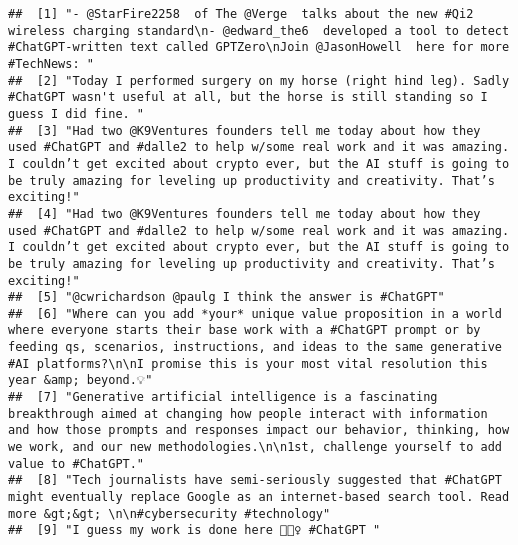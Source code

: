 \documentclass[
]{article}
\begin{document}
\begin{verbatim}
##  [1] "- @StarFire2258  of The @Verge  talks about the new #Qi2 wireless charging standard\n- @edward_the6  developed a tool to detect #ChatGPT-written text called GPTZero\nJoin @JasonHowell  here for more #TechNews: "                                                                                            
##  [2] "Today I performed surgery on my horse (right hind leg). Sadly #ChatGPT wasn't useful at all, but the horse is still standing so I guess I did fine. "                                                                                                                                                          
##  [3] "Had two @K9Ventures founders tell me today about how they used #ChatGPT and #dalle2 to help w/some real work and it was amazing. I couldn’t get excited about crypto ever, but the AI stuff is going to be truly amazing for leveling up productivity and creativity. That’s exciting!"                        
##  [4] "Had two @K9Ventures founders tell me today about how they used #ChatGPT and #dalle2 to help w/some real work and it was amazing. I couldn’t get excited about crypto ever, but the AI stuff is going to be truly amazing for leveling up productivity and creativity. That’s exciting!"                        
##  [5] "@cwrichardson @paulg I think the answer is #ChatGPT"                                                                                                                                                                                                                                                           
##  [6] "Where can you add *your* unique value proposition in a world where everyone starts their base work with a #ChatGPT prompt or by feeding qs, scenarios, instructions, and ideas to the same generative #AI platforms?\n\nI promise this is your most vital resolution this year &amp; beyond.💡"                
##  [7] "Generative artificial intelligence is a fascinating breakthrough aimed at changing how people interact with information and how those prompts and responses impact our behavior, thinking, how we work, and our new methodologies.\n\n1st, challenge yourself to add value to #ChatGPT."                       
##  [8] "Tech journalists have semi-seriously suggested that #ChatGPT might eventually replace Google as an internet-based search tool. Read more &gt;&gt; \n\n#cybersecurity #technology"                                                                                                                              
##  [9] "I guess my work is done here 🤷🏻‍♀️ #ChatGPT "                                                                                                                                                                                                                                                                  

\end{verbatim}
\end{document}

